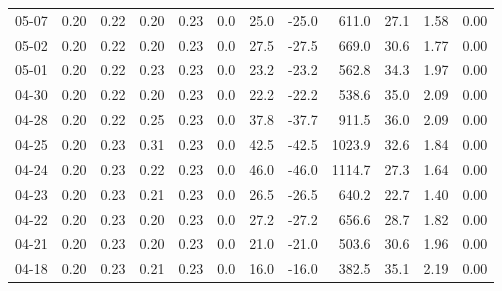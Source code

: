 \begin{threeparttable}
{\begin{tabular}{lrrrrrrrrrrr}
  05-07 &          0.20 &          0.22 &          0.20 &        0.23 &                 0.0 &                25.0 &      -25.0 &               611.0 &             27.1 &            1.58 &                   0.00 \\
  05-02 &          0.20 &          0.22 &          0.20 &        0.23 &                 0.0 &                27.5 &      -27.5 &               669.0 &             30.6 &            1.77 &                   0.00 \\
  05-01 &          0.20 &          0.22 &          0.23 &        0.23 &                 0.0 &                23.2 &      -23.2 &               562.8 &             34.3 &            1.97 &                   0.00 \\
  04-30 &          0.20 &          0.22 &          0.20 &        0.23 &                 0.0 &                22.2 &      -22.2 &               538.6 &             35.0 &            2.09 &                   0.00 \\
  04-28 &          0.20 &          0.22 &          0.25 &        0.23 &                 0.0 &                37.8 &      -37.7 &               911.5 &             36.0 &            2.09 &                   0.00 \\
  04-25 &          0.20 &          0.23 &          0.31 &        0.23 &                 0.0 &                42.5 &      -42.5 &              1023.9 &             32.6 &            1.84 &                   0.00 \\
  04-24 &          0.20 &          0.23 &          0.22 &        0.23 &                 0.0 &                46.0 &      -46.0 &              1114.7 &             27.3 &            1.64 &                   0.00 \\
  04-23 &          0.20 &          0.23 &          0.21 &        0.23 &                 0.0 &                26.5 &      -26.5 &               640.2 &             22.7 &            1.40 &                   0.00 \\
  04-22 &          0.20 &          0.23 &          0.20 &        0.23 &                 0.0 &                27.2 &      -27.2 &               656.6 &             28.7 &            1.82 &                   0.00 \\
  04-21 &          0.20 &          0.23 &          0.20 &        0.23 &                 0.0 &                21.0 &      -21.0 &               503.6 &             30.6 &            1.96 &                   0.00 \\
  04-18 &          0.20 &          0.23 &          0.21 &        0.23 &                 0.0 &                16.0 &      -16.0 &               382.5 &             35.1 &            2.19 &                   0.00 \\

\end{tabular}}
\end{threeparttable}
